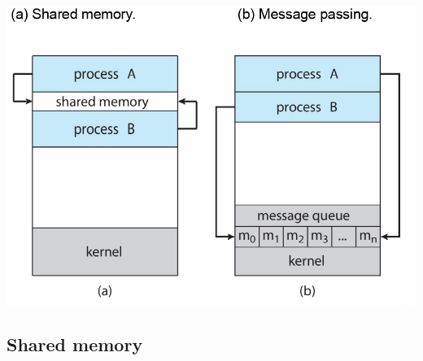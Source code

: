 \documentclass{article}
\begin{document}
\begin{center}
    \includegraphics[scale=0.3]{5_ipc.png}
\end{center}

\subsection*{Shared memory}
\end{document}
